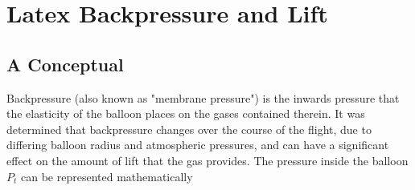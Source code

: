 \documentclass[useAMS,usenatbib]{mn2e}
\begin{document}
\begin{comment}
Substituting in $\frac{m}{V}$ for $\rho$ as before:

\begin{equation}
I = \frac{61 m \pi r_{max} \, ^{2} L^{3}}{1280\left( \frac{1}{3} \pi r_{max} \: ^{2} L \right) } = \frac{183 m L^{2}}{1280}
\end{equation}

Now the inertia is in terms of the mass and length of the rod, which is easy for someone to measure.  For n rods attached in this method, the equation becomes:

\begin{equation}
I = \frac{183 n m L^{2}}{1280}
\end{equation}

\end{comment}


\section{Latex Backpressure and Lift}

\subsection{A Conceptual }

Backpressure (also known as "membrane pressure") is the inwards pressure that the elasticity of the balloon places on the gases contained therein. It was determined that backpressure changes over the course of the flight, due to differing balloon radius and atmospheric pressures, and can have a significant effect on the amount of lift that the gas provides. The pressure inside the balloon $P_t$ can be represented mathematically 

\label{lastpage}
\end{document}
